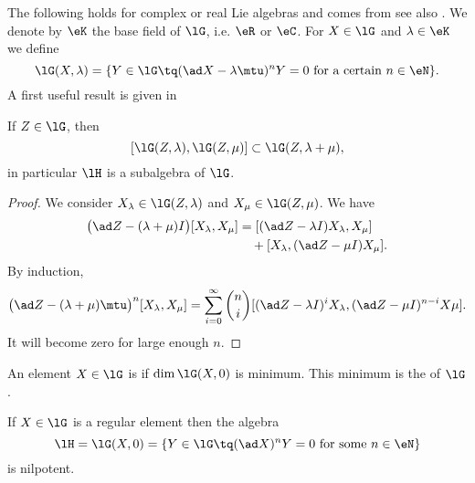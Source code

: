 The following holds for complex or real Lie algebras and comes from \cite{Sagle} see also \cite{SamelsonNotesLieAlg}. We denote by $\eK$ the base field of $\lG$, i.e. $\eR$ or $\eC$. For $X\in\lG$ and $\lambda\in\eK$ we define
\begin{equation}
\lG(X,\lambda)=\{Y\in\lG\tq (\ad X-\lambda\mtu)^nY=0\textrm{ for a certain $n\in\eN$}\}.
\end{equation}
A first useful result is given in
\begin{lemma}
If $Z\in\lG$, then
\[
[\lG(Z,\lambda),\lG(Z,\mu)]\subset\lG(Z,\lambda+\mu),
\]
in particular $\lH$ is a subalgebra of $\lG$.
\label{lem:lambda_mu_plus}
\end{lemma}

\begin{proof}
We consider $X_{\lambda}\in\lG(Z,\lambda)$ and $X_{\mu}\in\lG(Z,\mu)$. We have
\begin{equation}
\begin{split}
\big( \ad Z-(\lambda+\mu)I\big)[X_{\lambda},X_{\mu}]&=[ (\ad Z-\lambda I)X_{\lambda},X_{\mu} ]\\
            &\quad+[X_{\lambda}, (\ad Z-\mu I)X_{\mu} ].
\end{split}                    
\end{equation}
By induction,
\begin{equation}
\big( \ad Z-(\lambda+\mu)\mtu\big)^n[X_{\lambda},X_{\mu}]=\sum_{i=0}^{\infty}\binom{n}{i}
[ (\ad Z-\lambda I)^iX_{\lambda} ,(\ad Z-\mu I)^{n-i}X\mu].
\end{equation}
It will become zero for large enough $n$.
\end{proof}


An element $X\in\lG$ is  if $\dim\lG(X,0)$ is minimum\angl. This minimum is the  of $\lG$. 

\begin{proposition}
    If $X\in\lG$ is a regular element then the algebra
    \begin{equation}
        \lH=\lG(X,0)=\{Y\in\lG\tq(\ad X)^nY=0\text{ for some $n\in\eN$}\}
    \end{equation}
    is nilpotent.
\end{proposition}

